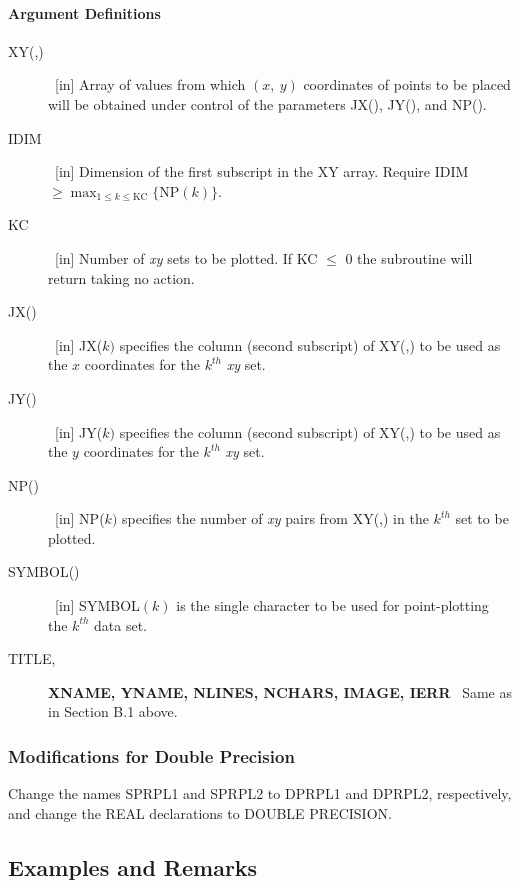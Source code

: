 \documentclass[twoside]{MATH77}
\begin{document}
\paragraph{Argument Definitions}

\begin{description}

\item[XY(,)] \ [in] Array of values from which $(x,\ y)$ coordinates of points
to be placed will be obtained under control of the parameters JX(), JY(),
and NP().

\item[IDIM] \ [in] Dimension of the first subscript in the XY array. Require
IDIM ${\displaystyle \geq \max_{1 \leq k \leq \text{KC}}\{\text{NP}(k)\}}$.

\item[KC] \ [in] Number of {\em xy} sets to be plotted. If KC $\leq$ 0
the subroutine will return taking no action.

\item[JX()] \ [in] JX($k)$ specifies the column (second subscript) of XY(,)
to be used as the $x$ coordinates for the $k^{th}$ {\em xy} set.

\item[JY()] \ [in] JY($k)$ specifies the column (second subscript) of XY(,)
to be used as the $y$ coordinates for the $k^{th}$ {\em xy} set.

\item[NP()] \ [in] NP($k)$ specifies the number of {\em xy} pairs from XY(,)
in the $k^{th}$ set to be plotted.

\item[SYMBOL()] \ [in] SYMBOL$(k)$ is the single character to be used for
point-plotting the $k^{th}$ data set.

\item[TITLE,]{\bf XNAME, YNAME, NLINES, NCHARS,\newline
IMAGE, IERR} \ Same as in Section B.1 above.

\end{description}

\subsubsection{Modifications for Double Precision}

Change the names SPRPL1 and SPRPL2 to DPRPL1 and DPRPL2, respectively, and
change the REAL declarations to DOUBLE PRECISION.

\subsection{Examples and Remarks}
\end{document}
